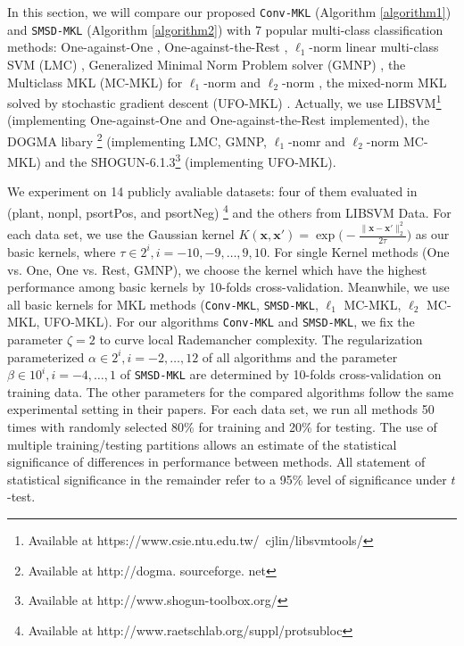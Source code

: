 \documentclass{article}
\begin{document}
In this section, we will  compare our proposed \texttt{Conv-MKL} (Algorithm \ref{algorithm1}) and \texttt{SMSD-MKL} (Algorithm \ref{algorithm2})
with 7 popular multi-class classification methods:
 One-against-One \cite{knerr1990single}, One-against-the-Rest \cite{bottou1994comparison},
$\ell_1$-norm linear multi-class SVM (LMC) \cite{CrammerS02},
Generalized Minimal Norm Problem solver (GMNP) \cite{franc2005optimization},
the Multiclass MKL (MC-MKL) for $\ell_1$-norm and $\ell_2$-norm \cite{ZienO2007},
 the mixed-norm MKL solved by stochastic gradient descent (UFO-MKL) \cite{OrabonaL11}.
Actually, we use LIBSVM\footnote{Available at https://www.csie.ntu.edu.tw/~cjlin/libsvmtools/}
(implementing One-against-One and One-against-the-Rest implemented),
the DOGMA libary \footnote{Available at http://dogma. sourceforge. net} \cite{orabona2009dogma} (implementing LMC, GMNP,
$\ell_1$-nomr and $\ell_2$-norm MC-MKL) and the SHOGUN-6.1.3\footnote{Available at http://www.shogun-toolbox.org/} (implementing UFO-MKL).

We experiment on 14 publicly avaliable datasets:
four of them evaluated in \cite{ZienO2007} (plant, nonpl, psortPos, and psortNeg)
\footnote{Available at http://www.raetschlab.org/suppl/protsubloc}
and the others from LIBSVM Data. %
For each data set, we use the Gaussian kernel
$K(\mathbf{x}, \mathbf{x}')=\exp\Big(-\frac{\|\mathbf{x}-\mathbf{x}'\|_2^2}{2\tau}\Big)$ as our basic kernels,
where $\tau \in {2^i, i=-10,-9,\ldots,9,10}$. For single Kernel methods (One vs. One, One vs. Rest, GMNP),
we choose the kernel which have the highest performance among basic kernels by 10-folds cross-validation.
Meanwhile, we use all basic kernels for MKL methods (\texttt{Conv-MKL}, \texttt{SMSD-MKL}, $\ell_1$ MC-MKL, $\ell_2$ MC-MKL, UFO-MKL).
For our algorithms \texttt{Conv-MKL} and \texttt{SMSD-MKL}, we fix the parameter $\zeta=2$ to curve local Rademancher complexity.
The regularization parameterized $\alpha \in {2^i, i=-2, \ldots, 12}$ of all algorithms and
the parameter $\beta \in {10^i, i=-4, \ldots, 1}$ of \texttt{SMSD-MKL} are determined by 10-folds cross-validation on training data.
The other parameters for the compared algorithms follow the same experimental setting in their papers.
For each data set, we run all methods 50 times with randomly selected 80\% for training and 20\% for testing.
The use of multiple training/testing partitions allows an estimate of the statistical significance of differences
in performance between methods.
All statement of statistical significance in the remainder refer to a 95\% level of significance under $t$-test.
\end{document}
